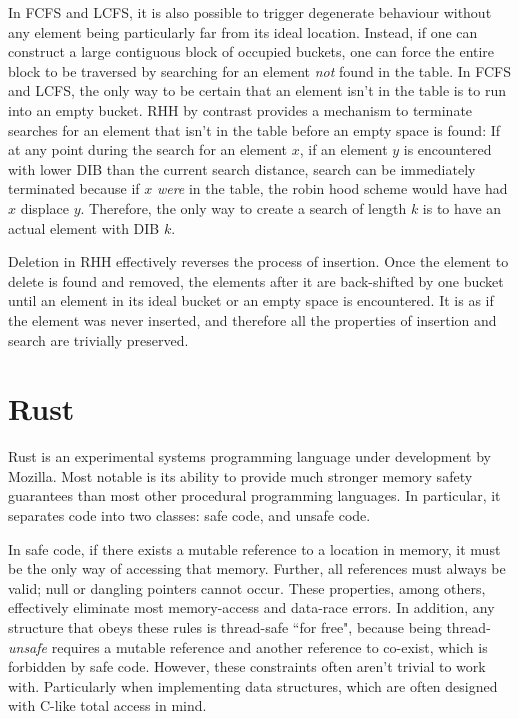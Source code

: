 \documentclass{cccg13}
\begin{document}
In FCFS and LCFS, it is also possible to trigger degenerate behaviour without any element being particularly far from its ideal location. Instead, if one can construct a large contiguous block of occupied buckets, one can force the entire block to be traversed by searching for an element \emph{not} found in the table. In FCFS and LCFS, the only way to be certain that an element isn't in the table is to run into an empty bucket. RHH by contrast provides a mechanism to terminate searches for an element that isn't in the table before an empty space is found: If at any point during the search for an element $x$, if an element $y$ is encountered with lower DIB than the current search distance, search can be immediately terminated because if $x$ \emph{were} in the table, the robin hood scheme would have had $x$ displace $y$. Therefore, the only way to create a search of length $k$ is to have an actual element with DIB $k$.

Deletion in RHH effectively reverses the process of insertion. Once the element to delete is found and removed, the elements after it are back-shifted by one bucket until an element in its ideal bucket or an empty space is encountered. It is as if the element was never inserted, and therefore all the properties of insertion and search are trivially preserved.





\section{Rust}

Rust is an experimental systems programming language under development by Mozilla. Most notable is its ability to provide much stronger memory safety guarantees than most other procedural programming languages. In particular, it separates code into two classes: safe code, and unsafe code.

In safe code, if there exists a mutable reference to a location in memory, it must be the only way of accessing that memory. Further, all references must always be valid; null or dangling pointers cannot occur. These properties, among others, effectively eliminate most memory-access and data-race errors. In addition, any structure that obeys these rules is thread-safe ``for free", because being thread-\emph{unsafe} requires a mutable reference and another reference to co-exist, which is forbidden by safe code. However, these constraints often aren't trivial to work with. Particularly when implementing data structures, which are often designed with C-like total access in mind.
\end{document}
